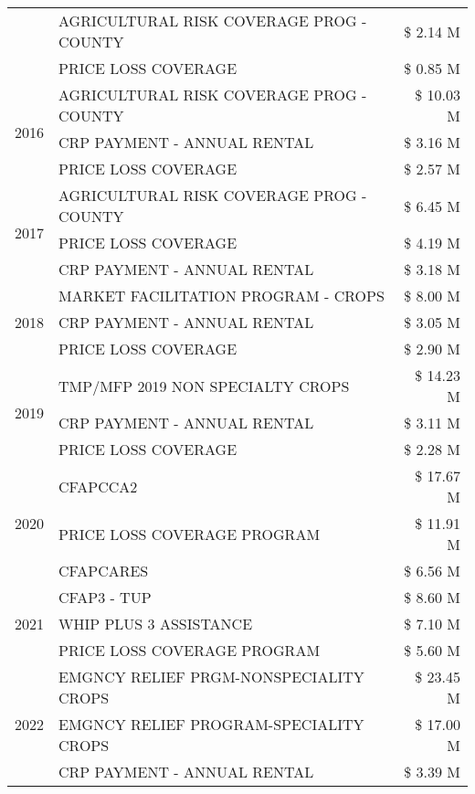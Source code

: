 \begin{tabular}{llr}
 & AGRICULTURAL RISK COVERAGE PROG - COUNTY & \$ 2.14 M \\
 & PRICE LOSS COVERAGE & \$ 0.85 M \\
\cline{1-3}
\multirow[t]{3}{*}{2016} & AGRICULTURAL RISK COVERAGE PROG - COUNTY & \$ 10.03 M \\
 & CRP PAYMENT - ANNUAL RENTAL & \$ 3.16 M \\
 & PRICE LOSS COVERAGE & \$ 2.57 M \\
\cline{1-3}
\multirow[t]{3}{*}{2017} & AGRICULTURAL RISK COVERAGE PROG - COUNTY & \$ 6.45 M \\
 & PRICE LOSS COVERAGE & \$ 4.19 M \\
 & CRP PAYMENT - ANNUAL RENTAL & \$ 3.18 M \\
\cline{1-3}
\multirow[t]{3}{*}{2018} & MARKET FACILITATION PROGRAM - CROPS & \$ 8.00 M \\
 & CRP PAYMENT - ANNUAL RENTAL & \$ 3.05 M \\
 & PRICE LOSS COVERAGE & \$ 2.90 M \\
\cline{1-3}
\multirow[t]{3}{*}{2019} & TMP/MFP 2019 NON SPECIALTY CROPS & \$ 14.23 M \\
 & CRP PAYMENT - ANNUAL RENTAL & \$ 3.11 M \\
 & PRICE LOSS COVERAGE & \$ 2.28 M \\
\cline{1-3}
\multirow[t]{3}{*}{2020} & CFAPCCA2 & \$ 17.67 M \\
 & PRICE LOSS COVERAGE PROGRAM & \$ 11.91 M \\
 & CFAPCARES & \$ 6.56 M \\
\cline{1-3}
\multirow[t]{3}{*}{2021} & CFAP3 - TUP & \$ 8.60 M \\
 & WHIP PLUS 3 ASSISTANCE & \$ 7.10 M \\
 & PRICE LOSS COVERAGE PROGRAM & \$ 5.60 M \\
\cline{1-3}
\multirow[t]{3}{*}{2022} & EMGNCY RELIEF PRGM-NONSPECIALITY CROPS & \$ 23.45 M \\
 & EMGNCY RELIEF PROGRAM-SPECIALITY CROPS & \$ 17.00 M \\
 & CRP PAYMENT - ANNUAL RENTAL & \$ 3.39 M \\
\cline{1-3}
\bottomrule
\end{tabular}
